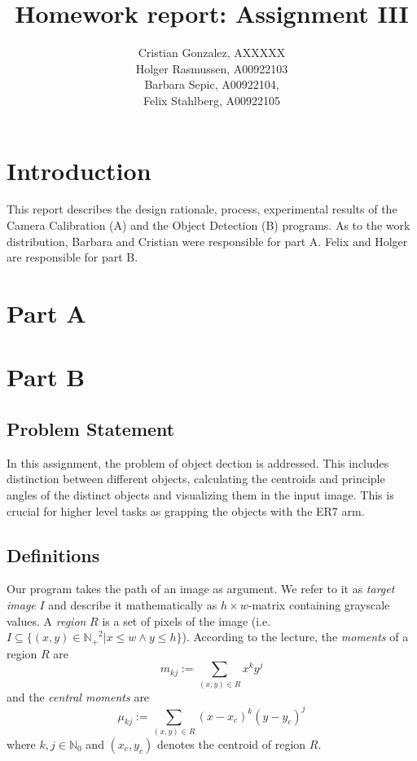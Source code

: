 \documentclass[letter,12pt]{article}
\begin{document}
\title{Homework report: Assignment III}
\author{Cristian Gonzalez, AXXXXX\\
Holger Rasmussen, A00922103\\
Barbara Sepic, A00922104,\\
Felix Stahlberg, A00922105
}
\maketitle
\section{Introduction}
This report describes the design rationale, process, experimental results of the Camera Calibration (A) and the Object Detection (B) programs.   As to the work distribution, Barbara and Cristian were responsible for part A.  Felix and Holger are responsible for part B.  
\section{Part A}

\section{Part B}

\subsection{Problem Statement}
In this assignment, the problem of object dection is addressed. This includes distinction between different objects, calculating the centroids and principle angles of the distinct objects and visualizing them in the input image. This is crucial for higher level tasks as grapping the objects with the ER7 arm.

\subsection{Definitions}
Our program takes the path of an image as argument. We refer to it as {\em target image} $I$ and describe it mathematically as $h\times w$-matrix containing grayscale values. A {\em region} $R$ is a set of pixels of the image (i.e.\ $I\subseteq \{(x,y)\in {\mathbb{N}_+}^2| x \leq w \land y\leq h\}$). According to the lecture, the {\em moments} of a region $R$ are
\begin{equation*}
m_{kj} := \sum_{(x,y)\in R} x^ky^j
\end{equation*}
and the {\em central moments} are
\begin{equation*}
\mu_{kj} := \sum_{(x,y)\in R} {(x-x_c)}^k{(y-y_c)}^j
\end{equation*}
where $k,j\in \mathbb{N}_0$ and $(x_c, y_c)$ denotes the centroid of region $R$.
\end{document}
